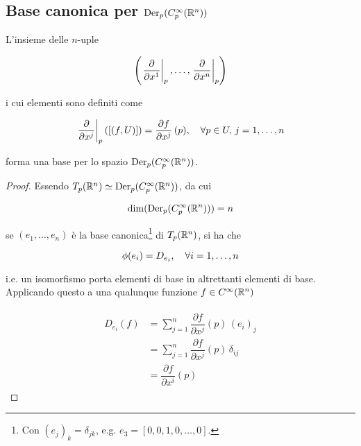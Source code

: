 \subsection{Base canonica per $ \operatorname{Der}_{p}(C_{p}^{\infty}(\mathbb{R}^{n})) $}

L'insieme delle $ n $-uple

\begin{equation}
	\left( \eval{ \pdv{x^{1}} }_{p}, \dots, \eval{ \pdv{x^{n}} }_{p}  \right)
\end{equation}

i cui elementi sono definiti come

\begin{equation}
	\eval{ \pdv{x^{j}} }_{p} ([(f,U)]) = \pdv{f}{x^{j}} \, (p) \qcomma \forall p \in U, \, j = 1, \dots, n
\end{equation}

forma una base per lo spazio $ \operatorname{Der}_{p}(C_{p}^{\infty}(\mathbb{R}^{n})) $.

\begin{proof}
	Essendo $ T_{p}(\mathbb{R}^{n}) \simeq \operatorname{Der}_{p}(C_{p}^{\infty}(\mathbb{R}^{n})) $, da cui
	
	\begin{equation}
		\dim ( \operatorname{Der}_{p}(C_{p}^{\infty}(\mathbb{R}^{n})) ) = n
	\end{equation}
		
	se $ (e_{1},\dots,e_{n}) $ è la base canonica\footnote{%
		Con $ (e_{j})_{k} = \delta_{jk} $, e.g. $ e_{3} = [0,0,1,0,\dots,0] $.%
	} di $ T_{p}(\mathbb{R}^{n}) $, si ha che

	\begin{equation}
		\phi(e_{i}) = D_{e_{i}} \qcomma \forall i=1,\dots,n
	\end{equation}

	i.e. un isomorfismo porta elementi di base in altrettanti elementi di base.\\
	Applicando questo a una qualunque funzione $ f \in C^{\infty} (\mathbb{R}^{n}) $
	
	\begin{align}
		\begin{split}
			D_{e_{i}} (f) &= \sum_{j=1}^{n} \dfrac{\partial f}{\partial x^{j}} (p) \, (e_{i})_{j}\\
			&= \sum_{j=1}^{n} \dfrac{\partial f}{\partial x^{j}} (p) \, \delta_{ij}\\
			&= \dfrac{\partial f}{\partial x^{i}} (p)
		\end{split}
	\end{align}
\end{proof}

